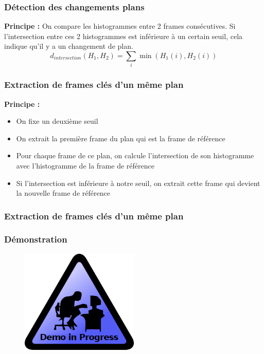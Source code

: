  \begin{frame}
 \frametitle{Détection des changements plans}
 
 \textbf{Principe :} On compare les histogrammes entre 2 frames consécutives. Si l'intersection entre ces 2 histogrammes est inférieure à un certain seuil, cela indique qu'il y a un changement de plan. \\
 \[d_{intersection}(H_{1},H_{2}) = \sum_{i} \min(H_{1}(i),H_{2}(i))\]
 
 \end{frame}
 
 
 \begin{frame}
 \frametitle{Extraction de frames clés d'un même plan}
 \textbf{Principe :}
\begin{itemize} 
\item{On fixe un deuxième seuil}
\item{On extrait la première frame du plan qui est la frame de référence}
\item{Pour chaque frame de ce plan, on calcule l'intersection de son histogramme avec l'histogramme de la frame de référence}
\item{Si l'intersection est inférieure à notre seuil, on extrait cette frame qui devient la nouvelle frame de référence}
\end{itemize}
\end{frame}

\begin{frame}
 \frametitle{Extraction de frames clés d'un même plan}
\end{frame}



 \begin{frame}
   \frametitle{Démonstration}
   \begin{figure}
   \includegraphics[width=0.5\textwidth]{Fig/demoInProgress.png}
   \end{figure}

 \end{frame}